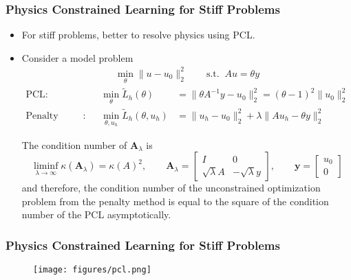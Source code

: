 \documentclass[usenames,dvipsnames]{beamer}
\begin{document}
\begin{frame}
	\frametitle{Physics Constrained Learning for Stiff Problems}
	
	\begin{itemize}
		\item For stiff problems, better to resolve physics using PCL.
		\item Consider a model problem 
		\begin{gather*}
			\min_{\theta} \|u-u_0\|^2_2 \qquad \text{s.t.} \;\; Au = \theta y
		\end{gather*}
	\vspace{-0.5cm}
	\begin{align*}
		\text{PCL}: &&\ \min_\theta \tilde L_h(\theta) &= \|\theta A^{-1} y - u_0\|^2_2 = (\theta-1)^2\|u_0\|_2^2\\
				\text{Penalty Method}: &&\ 
			\min_{\theta, u_h}\tilde L_h(\theta, u_h) &= \|u_h-u_0\|^2_2 + \lambda \|Au_h -\theta y\|_2^2
	\end{align*}
\vspace{-0.5cm}
\begin{theorem}
	The condition number of $\mathbf{A}_\lambda$ is 
	\begin{equation*}
		\liminf_{\lambda\rightarrow \infty}\kappa(\mathbf{A}_\lambda)  =  \kappa(A)^2,\qquad \mathbf{A}_\lambda = \begin{bmatrix}
			I & 0\\
			\sqrt{\lambda}A & -\sqrt{\lambda}y
		\end{bmatrix}, \qquad 
		\mathbf{y} = \begin{bmatrix}
			u_0\\ 0
		\end{bmatrix}
	\end{equation*}
	and therefore, the condition number of the unconstrained optimization problem from the penalty method is equal to the square of the condition number of the PCL asymptotically. 
\end{theorem}
 	\end{itemize}
\end{frame}

\begin{frame}
	\frametitle{Physics Constrained Learning for Stiff Problems}
	\begin{figure}[hbt]
		\centering
		\texttt{[image: figures/pcl.png]}
	\end{figure}
\end{frame}
\end{document}
